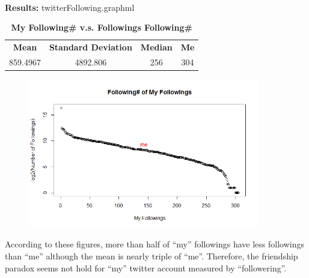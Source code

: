 \documentclass{article}
\begin{document}
		\noindent\\\textbf{Results: }twitterFollowing.graphml
		\begin{table}[!htb]
			\centering
			\caption{\textbf{My Following\# v.s. Followings Following\#}}
			\begin{tabular}{cccc}
				\toprule
				\textbf{Mean} & \textbf{Standard Deviation} & \textbf{Median} & \textbf{Me}\\
				859.4967 & 4892.806 & 256 & 304\\
				\bottomrule
			\end{tabular}
		\end{table}
		\begin{figure}[!htb]
			\centering 
			\href{https://github.com/zhangboroy/cs532-s17/blob/master/assg04_submission/TwitterFollowings.png}
			{\includegraphics[width=0.9\textwidth]{TwitterFollowings.png}}
			\label{fig:Twitter Followings} 
		\end{figure}

		According to these figures, more than half of ``my'' followings have less followings than ``me'' although the mean is nearly triple of ``me''. Therefore, the friendship paradox seems not hold for ``my'' twitter account measured by ``followering''.\\
	
\end{document}
